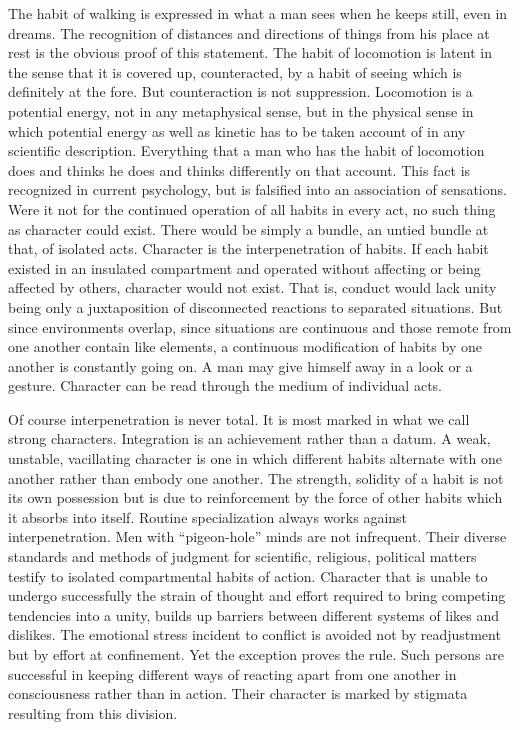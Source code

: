 \documentclass[12pt]{article}
\begin{document}
The habit of walking is expressed in what a man
sees when he keeps still, even in dreams. The recognition
of distances and directions of things from his
place at rest is the obvious proof of this statement.
The habit of locomotion is latent in the sense that it is
covered up, counteracted, by a habit of seeing which is
definitely at the fore. But counteraction is not suppression.
Locomotion is a potential energy, not in
any metaphysical sense, but in the physical sense in
which potential energy as well as kinetic has to be taken
account of in any scientific description. Everything
that a man who has the habit of locomotion does and
thinks he does and thinks differently on that account.
This fact is recognized in current psychology, but is
falsified into an association of sensations. Were it not
for the continued operation of all habits in every act,
no such thing as character could exist. There would
be simply a bundle, an untied bundle at that, of isolated
acts. Character is the interpenetration of habits. If
each habit existed in an insulated compartment and
operated without affecting or being affected by others,
character would not exist. That is, conduct would lack
unity being only a juxtaposition of disconnected reactions
to separated situations. But since environments
overlap, since situations are continuous and those remote
from one another contain like elements, a continuous
modification of habits by one another is constantly
going on. A man may give himself away in a look or
a gesture. Character can be read through the medium
of individual acts.

Of course interpenetration is never total. It is most
marked in what we call strong characters. Integration
is an achievement rather than a datum. A weak, unstable,
vacillating character is one in which different
habits alternate with one another rather than embody
one another. The strength, solidity of a habit is not
its own possession but is due to reinforcement by the
force of other habits which it absorbs into itself.
Routine specialization always works against interpenetration.
Men with ``pigeon-hole'' minds are not infrequent.
Their diverse standards and methods of
judgment for scientific, religious, political matters testify
to isolated compartmental habits of action. Character
that is unable to undergo successfully the strain
of thought and effort required to bring competing
tendencies into a unity, builds up barriers between
different systems of likes and dislikes. The emotional
stress incident to conflict is avoided not by readjustment
but by effort at confinement. Yet the exception
proves the rule. Such persons are successful in keeping
different ways of reacting apart from one another in
consciousness rather than in action. Their character
is marked by stigmata resulting from this division.
\end{document}
